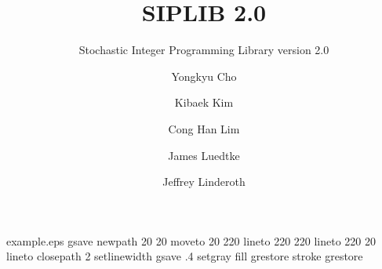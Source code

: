 %
%
%
%
%
\begin{filecontents*}{example.eps}
gsave
newpath
  20 20 moveto
  20 220 lineto
  220 220 lineto
  220 20 lineto
closepath
2 setlinewidth
gsave
  .4 setgray fill
grestore
stroke
grestore
\end{filecontents*}
%
\RequirePackage{fix-cm}
%
\documentclass[smallextended]{svjour3}       %
%
\smartqed  %
%
\usepackage{graphicx}
\usepackage{hyperref}
\usepackage{float}
\usepackage{mathrsfs,amsmath,amssymb,amscd,mathtools}
\usepackage{booktabs}
\usepackage{graphicx}


\DeclareMathOperator*{\PP}{\mathbb{P}}
\DeclareMathOperator*{\EE}{\mathbb{E}}

%
%
%
%


\title{SIPLIB 2.0
}
\subtitle{Stochastic Integer Programming Library version 2.0}


\author{Yongkyu Cho \and 
		Kibaek Kim \and
        Cong Han Lim \and
        James Luedtke \and
        Jeffrey Linderoth
}

